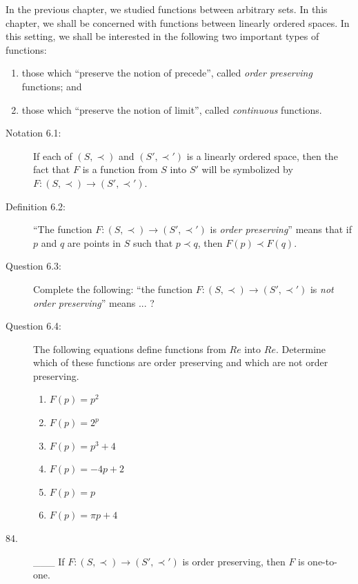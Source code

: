 \documentclass{book}
\begin{document}
In the previous chapter, we studied functions between arbitrary sets. In this chapter, we shall be concerned with functions between linearly ordered spaces. In this setting, we shall be interested in the following two important types of functions: 
\begin{enumerate}[\hspace{1cm}(1)]
  \item those which ``preserve the notion of precede'', called \emph{order preserving} functions; and 
  \item those which ``preserve the notion of limit'', called \emph{continuous} functions.
\end{enumerate}

\begin{description}

\item[Notation 6.1:] If each of $(S, \prec)$ and $(S', \prec ')$ is a linearly ordered space, then the fact that $F$ is a function from $S$ into $S'$ will be symbolized by $F: (S, \prec) \rightarrow (S', \prec ')$.

\item[Definition 6.2:] ``The function $F: (S, \prec) \rightarrow (S', \prec ')$ is \emph{order preserving}'' means that if $p$ and $q$ are points in $S$ such that $p \prec q$, then $F(p) \prec F(q)$.

\item[Question 6.3:] Complete the following: ``the function $F: (S, \prec) \rightarrow (S', \prec ')$ is \emph{not order preserving}'' means ... ?

\item[Question 6.4:] The following equations define functions from $Re$ into $Re$. Determine which of these functions are order preserving and which are not order preserving.
\begin{enumerate}[\hspace{1cm}(a)]
  \item $F(p) = p^{2}$ 
  \item $F(p) = 2^{p}$ 
  \item $F(p) = p^{3} + 4$
  \item $F(p) = -4p + 2$
  \item $F(p) = p$
  \item $F(p) = \pi p + 4$
\end{enumerate}

\item[84.] \_\_\_ If $F: (S, \prec) \rightarrow (S', \prec ')$ is order preserving, then $F$ is one-to-one.


\end{description}
\end{document}

